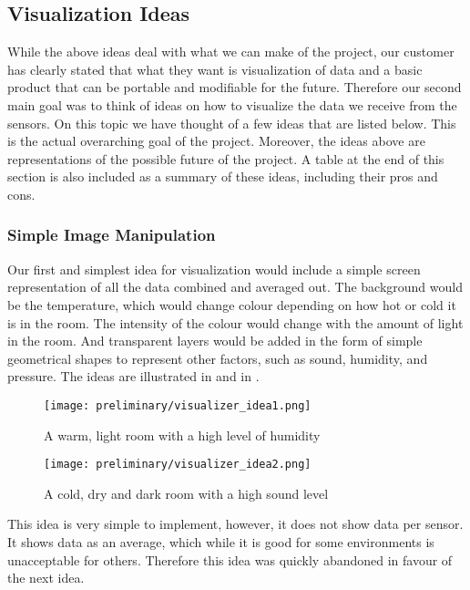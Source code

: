 \documentclass[../document]{subfiles}
\begin{document}
\subsection{Visualization Ideas}
While the above ideas deal with what we can make of the project, our customer has clearly stated that what they want is visualization of data and a basic product that can be portable and modifiable for the future. Therefore our second main goal was to think of ideas on how to visualize the data we receive from the sensors. On this topic we have thought of a few ideas that are listed below. This is the actual overarching goal of the project. Moreover, the ideas above are representations of the possible future of the project. A table at the end of this section is also included as a summary of these ideas, including their pros and cons.

\subsubsection{Simple Image Manipulation}
Our first and simplest idea for visualization would include a simple screen representation of all the data combined and averaged out. The background would be the temperature, which would change colour depending on how hot or cold it is in the room. The intensity of the colour would change with the amount of light in the room. And transparent layers would be added in the form of simple geometrical shapes to represent other factors, such as sound, humidity, and pressure. The ideas are illustrated in   and in .

\begin{figure}
	\texttt{[image: preliminary/visualizer\_idea1.png]}
	\caption{A warm, light room with a high level of humidity}
	\label{fig:visualizer_idea1}
\end{figure}

\begin{figure}
	\texttt{[image: preliminary/visualizer\_idea2.png]}
	\caption{A cold, dry and dark room with a high sound level}
	\label{fig:visualizer_idea2}
\end{figure}

This idea is very simple to implement, however, it does not show data per sensor. It shows data as an average, which while it is good for some environments is unacceptable for others. Therefore this idea was quickly abandoned in favour of the next idea.
\end{document}
